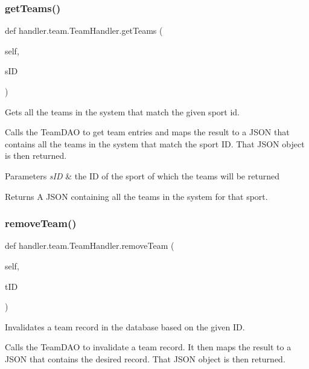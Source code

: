 \subsubsection{\texorpdfstring{get\+Teams()}{getTeams()}}
{\footnotesize\ttfamily def handler.\+team.\+Team\+Handler.\+get\+Teams (\begin{DoxyParamCaption}\item[{}]{self,  }\item[{}]{s\+ID }\end{DoxyParamCaption})}



Gets all the teams in the system that match the given sport id. 

Calls the Team\+D\+AO to get team entries and maps the result to a J\+S\+ON that contains all the teams in the system that match the sport ID. That J\+S\+ON object is then returned.


\begin{DoxyParams}{Parameters}
{\em s\+ID} & the ID of the sport of which the teams will be returned\\
\hline
\end{DoxyParams}
\begin{DoxyReturn}{Returns}
A J\+S\+ON containing all the teams in the system for that sport. 
\end{DoxyReturn}
\mbox{\label{classhandler_1_1team_1_1_team_handler_abc55ff5f4532a8486f8c941876dc84ce}} 
\subsubsection{\texorpdfstring{remove\+Team()}{removeTeam()}}
{\footnotesize\ttfamily def handler.\+team.\+Team\+Handler.\+remove\+Team (\begin{DoxyParamCaption}\item[{}]{self,  }\item[{}]{t\+ID }\end{DoxyParamCaption})}



Invalidates a team record in the database based on the given ID. 

Calls the Team\+D\+AO to invalidate a team record. It then maps the result to a J\+S\+ON that contains the desired record. That J\+S\+ON object is then returned.


